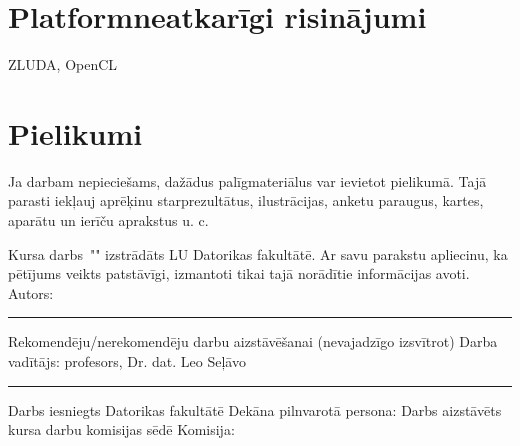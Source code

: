 \documentclass[12pt]{report}%
\theoremstyle{definition}
\def\degree{Kursa darbs}
\def\supervisor{Darba vadītājs: profesors, Dr. dat. Leo Seļāvo}
\begin{document}
\chapter{Platformneatkarīgi risinājumi}
ZLUDA, OpenCL


\cleardoublepage
{}
{}
\printbibliography

\newpage
\chapter*{Pielikumi}


Ja darbam nepieciešams, dažādus palīgmateriālus var ievietot pielikumā. Tajā
parasti iekļauj aprēķinu starprezultātus, ilustrācijas, anketu paraugus, kartes, aparātu un ierīču aprakstus u. c.


\newpage
\thispagestyle{empty}
\makeatletter
{
\noindent
\degree \ "\@title" izstrādāts LU Datorikas fakultātē.
\newline
\newline
\noindent
Ar savu parakstu apliecinu, ka pētījums veikts patstāvīgi, izmantoti tikai tajā norādītie informācijas avoti.
\newline
\newline
\noindent
Autors: \@author \space \rule{30mm}{0.2mm}
\newline
\newline
\newline
\noindent
Rekomendēju/nerekomendēju darbu aizstāvēšanai (nevajadzīgo izsvītrot)
\newline
\newline
\noindent 
\supervisor \space \rule{30mm}{0.2mm}
\newline
\newline
\newline
\newline
\newline
\noindent 
Darbs iesniegts Datorikas fakultātē
\newline
\newline
\noindent 
Dekāna pilnvarotā persona:
\newline
\newline
\newline
\newline
\noindent 
Darbs aizstāvēts kursa darbu komisijas sēdē
\newline
\newline
\newline
\newline
\newline
\noindent 
Komisija:
}
\makeatother
\end{document}
